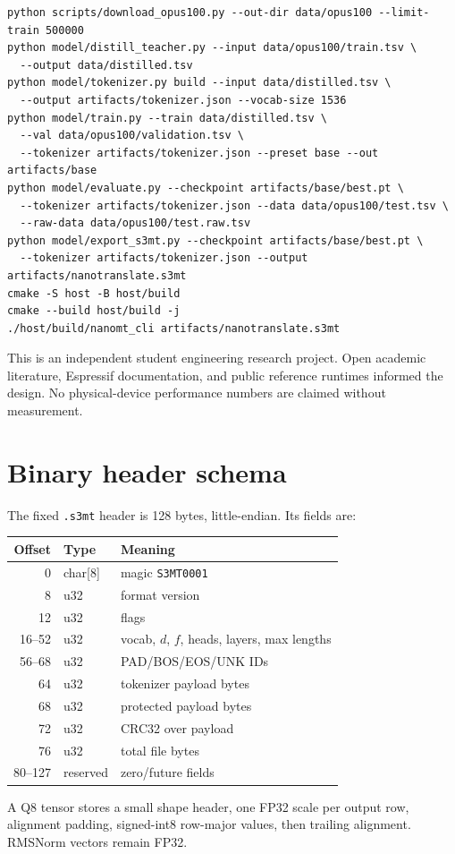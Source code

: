 \documentclass{article}
\begin{document}
\begin{verbatim}
python scripts/download_opus100.py --out-dir data/opus100 --limit-train 500000
python model/distill_teacher.py --input data/opus100/train.tsv \
  --output data/distilled.tsv
python model/tokenizer.py build --input data/distilled.tsv \
  --output artifacts/tokenizer.json --vocab-size 1536
python model/train.py --train data/distilled.tsv \
  --val data/opus100/validation.tsv \
  --tokenizer artifacts/tokenizer.json --preset base --out artifacts/base
python model/evaluate.py --checkpoint artifacts/base/best.pt \
  --tokenizer artifacts/tokenizer.json --data data/opus100/test.tsv \
  --raw-data data/opus100/test.raw.tsv
python model/export_s3mt.py --checkpoint artifacts/base/best.pt \
  --tokenizer artifacts/tokenizer.json --output artifacts/nanotranslate.s3mt
cmake -S host -B host/build
cmake --build host/build -j
./host/build/nanomt_cli artifacts/nanotranslate.s3mt
\end{verbatim}

\begin{ack}
This is an independent student engineering research project. Open academic literature, Espressif documentation, and public reference runtimes informed the design. No physical-device performance numbers are claimed without measurement.
\end{ack}




\appendix
\section{Binary header schema}
The fixed \texttt{.s3mt} header is 128 bytes, little-endian. Its fields are:
\begin{table}[H]
\centering
\begin{tabular}{rll}
\toprule
Offset & Type & Meaning\\
\midrule
0 & char[8] & magic \texttt{S3MT0001}\\
8 & u32 & format version\\
12 & u32 & flags\\
16--52 & u32 & vocab, $d$, $f$, heads, layers, max lengths\\
56--68 & u32 & PAD/BOS/EOS/UNK IDs\\
64 & u32 & tokenizer payload bytes\\
68 & u32 & protected payload bytes\\
72 & u32 & CRC32 over payload\\
76 & u32 & total file bytes\\
80--127 & reserved & zero/future fields\\
\bottomrule
\end{tabular}
\end{table}
A Q8 tensor stores a small shape header, one FP32 scale per output row, alignment padding, signed-int8 row-major values, then trailing alignment. RMSNorm vectors remain FP32.
\end{document}
